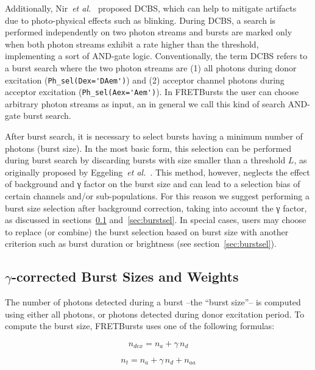 Additionally, Nir~\textit{et al.}~\cite{Nir_2006} proposed DCBS, which can help
to mitigate artifacts due to photo-physical effects such as blinking.
During DCBS, a search is performed independently on two photon streams
and bursts are marked only when both photon streams exhibit a rate higher than
the threshold, implementing a sort of AND-gate logic.
Conventionally, the term DCBS refers to a burst search where the two photon streams
are (1) all photons during donor excitation (\verb|Ph_sel(Dex='DAem')|) and
(2) acceptor channel photons during acceptor excitation (\verb|Ph_sel(Aex='Aem')|).
In FRETBursts the user can choose arbitrary photon streams as input, an in general
we call this kind of search AND-gate burst search.

After burst search, it is necessary to select
bursts having a minimum number of photons (burst size). In the most
basic form, this selection can be performed during burst search by discarding
bursts with size smaller than a threshold $L$, as originally proposed by
Eggeling~\textit{et al.}~\cite{Eggeling_1998}.
This method, however, neglects the effect
of background and γ factor on the burst size and can lead to a selection
bias of certain channels and/or sub-populations.
For this reason we suggest performing a burst size selection after background
correction, taking into account the γ factor, as discussed in
sections~\ref{sec:burstsizeweights} and~\ref{sec:burstsel}.
In special cases, users may choose to replace (or combine)
the burst selection based on burst size
with another criterion such as burst duration or brightness (see section~\ref{sec:burstsel}).

\subsection{$\gamma$-corrected Burst Sizes and Weights}
\label{sec:burstsizeweights}

The number of photons detected during a burst --the ``burst size''--
is computed using either all photons, or photons detected
during donor excitation period. To compute the burst size, FRETBursts uses
one of the following formulas:

\begin{equation}
\label{eq:burstsize_dex}
n_{dex} = n_a + \gamma\,n_d
\end{equation}

\begin{equation}
\label{eq:burstsize_allph}
n_t = n_a + \gamma\,n_d + n_{aa}
\end{equation}

